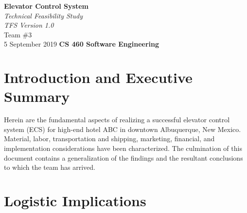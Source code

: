 \documentclass[12pt]{article}
\begin{document}
\begin{titlepage}
\begin{flushleft}
\vspace*{1cm}
\Huge
\textbf{Elevator Control System}\\
\vspace{1cm}
\Huge
\textit{Technical Feasibility Study}\\
\vspace{1cm}
\Large
\textit{TFS Version 1.0}\\
\vspace{5cm}
\LARGE
Team \#3\\
5 September 2019
\vfill
\Huge
\textbf{CS 460 Software Engineering}
\end{flushleft}
\end{titlepage}
\normalsize
\tableofcontents
\newpage
\section{Introduction and Executive Summary}
Herein are the fundamental aspects of realizing a successful elevator control system (ECS) for high-end hotel ABC in downtown Albuquerque, New Mexico. Material, labor, transportation and shipping, marketing, financial, and implementation considerations have been characterized. The culmination of this document contains a generalization of the findings and the resultant conclusions to which the team has arrived.
\section{Logistic Implications}
\end{document}
